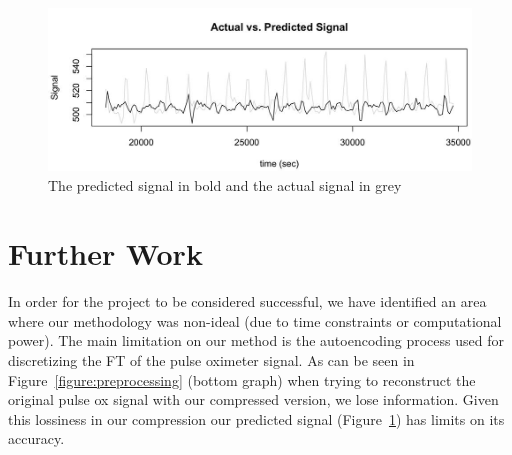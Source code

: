 \documentclass[12pt]{article}
\begin{document}
 \begin{figure}
\captionsetup{justification=raggedright}
\includegraphics[width=\textwidth]{images/actual_vs_pred_signal.jpg}
\caption{The predicted signal in bold and the actual signal in grey \label{figure:pred}}
\end{figure}

 \section{Further Work}
 In order for the project to be considered successful, we have identified an area where our methodology was non-ideal (due to time constraints or computational power).
The main limitation on our method is the autoencoding process used for discretizing the FT of the pulse oximeter signal. As can be seen in Figure~\ref{figure:preprocessing} (bottom graph) when trying to reconstruct the original pulse ox signal with our compressed version, we lose information. Given this lossiness in our compression our predicted signal (Figure~\ref{figure:pred}) has limits on its accuracy.



  
\end{document}
